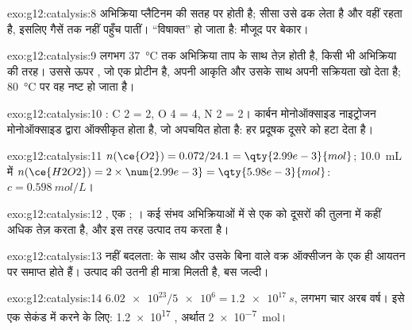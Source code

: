 \begin{solution}{exo:g12:catalysis:8}
अभिक्रिया प्लैटिनम की सतह पर होती है; सीसा उसे ढक लेता है और
वहीं रहता है, इसलिए गैसें  तक नहीं पहुँच पातीं। 
``विषाक्त'' हो जाता है: मौजूद पर बेकार।
\end{solution}

\begin{solution}{exo:g12:catalysis:9}
लगभग \qty{37}{\celsius} तक अभिक्रिया ताप के साथ तेज़ होती है,
किसी भी अभिक्रिया की तरह। उससे ऊपर , जो एक प्रोटीन है, अपनी
आकृति और उसके साथ अपनी सक्रियता खो देता है; \qty{80}{\celsius} पर वह नष्ट हो जाता है।
\end{solution}

\begin{solution}{exo:g12:catalysis:10}
: C 2 = 2, O 4 = 4, N 2 = 2। कार्बन मोनोऑक्साइड
नाइट्रोजन मोनोऑक्साइड द्वारा ऑक्सीकृत होता है, जो अपचयित होता है: हर प्रदूषक
दूसरे को हटा देता है।
\end{solution}

\begin{solution}{exo:g12:catalysis:11}
$n(\ce{O2}) = 0.072 / 24.1 = \qty{2.99e-3}{mol}$;
\qty{10.0}{mL} में $n(\ce{H2O2}) = 2 \times \num{2.99e-3} = \qty{5.98e-3}{mol}$:
$c = \qty{0.598}{mol/L}$।
\end{solution}

\begin{solution}{exo:g12:catalysis:12}
, एक ; ।
 कई संभव अभिक्रियाओं में से एक को दूसरों की तुलना में कहीं
अधिक तेज़ करता है, और इस तरह उत्पाद तय करता है।
\end{solution}

\begin{solution}{exo:g12:catalysis:13}
  नहीं बदलता:  के साथ और उसके बिना वाले वक्र
ऑक्सीजन के एक ही आयतन पर समाप्त होते हैं। उत्पाद की उतनी ही मात्रा
मिलती है, बस जल्दी।
\end{solution}

\begin{solution}{exo:g12:catalysis:14}
$\num{6.02e23} / \num{5e6} = \qty{1.2e17}{s}$, लगभग चार अरब वर्ष।
इसे एक सेकंड में करने के लिए: \num{1.2e17}  , अर्थात
\qty{2e-7}{mol}।
\end{solution}

